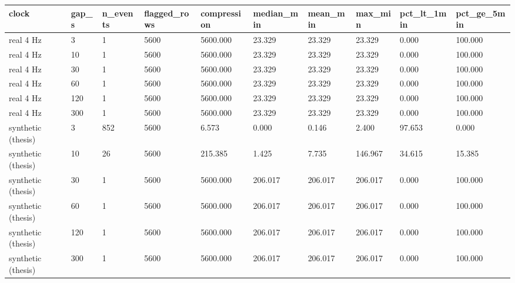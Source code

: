 \begin{tabular}{llllllllll}
\toprule
clock & gap\_s & n\_events & flagged\_rows & compression & median\_min & mean\_min & max\_min & pct\_lt\_1min & pct\_ge\_5min \\
\midrule
real 4 Hz & 3 & 1 & 5600 & 5600.000 & 23.329 & 23.329 & 23.329 & 0.000 & 100.000 \\
real 4 Hz & 10 & 1 & 5600 & 5600.000 & 23.329 & 23.329 & 23.329 & 0.000 & 100.000 \\
real 4 Hz & 30 & 1 & 5600 & 5600.000 & 23.329 & 23.329 & 23.329 & 0.000 & 100.000 \\
real 4 Hz & 60 & 1 & 5600 & 5600.000 & 23.329 & 23.329 & 23.329 & 0.000 & 100.000 \\
real 4 Hz & 120 & 1 & 5600 & 5600.000 & 23.329 & 23.329 & 23.329 & 0.000 & 100.000 \\
real 4 Hz & 300 & 1 & 5600 & 5600.000 & 23.329 & 23.329 & 23.329 & 0.000 & 100.000 \\
synthetic (thesis) & 3 & 852 & 5600 & 6.573 & 0.000 & 0.146 & 2.400 & 97.653 & 0.000 \\
synthetic (thesis) & 10 & 26 & 5600 & 215.385 & 1.425 & 7.735 & 146.967 & 34.615 & 15.385 \\
synthetic (thesis) & 30 & 1 & 5600 & 5600.000 & 206.017 & 206.017 & 206.017 & 0.000 & 100.000 \\
synthetic (thesis) & 60 & 1 & 5600 & 5600.000 & 206.017 & 206.017 & 206.017 & 0.000 & 100.000 \\
synthetic (thesis) & 120 & 1 & 5600 & 5600.000 & 206.017 & 206.017 & 206.017 & 0.000 & 100.000 \\
synthetic (thesis) & 300 & 1 & 5600 & 5600.000 & 206.017 & 206.017 & 206.017 & 0.000 & 100.000 \\
\bottomrule
\end{tabular}

